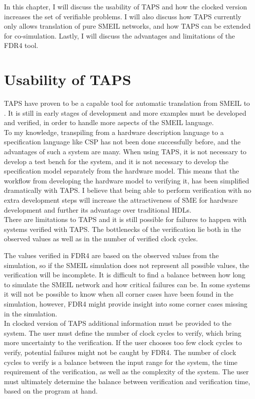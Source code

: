 In this chapter, I will discuss the usability of TAPS and how the clocked version increases the set of verifiable problems. I will also discuss how TAPS currently only allows translation of pure SMEIL networks, and how TAPS can be extended for co-simulation. Lastly, I will discuss the advantages and limitations of the FDR4 tool.
\section{Usability of TAPS}
TAPS have proven to be a capable tool for automatic translation from SMEIL to \cspm{}. It is still in early stages of development and more examples must be developed and verified, in order to handle more aspects of the SMEIL language.\\

To my knowledge, transpiling from a hardware description language to a specification language like CSP has not been done successfully before, and the advantages of such a system are many. When using TAPS, it is not necessary to develop a test bench for the system, and it is not necessary to develop the specification model separately from the hardware model. This means that the workflow from developing the hardware model to verifying it, has been simplified dramatically with TAPS. I believe that being able to perform verification with no extra development steps will increase the attractiveness of SME for hardware development and further its advantage over traditional HDLs.\\

There are limitations to TAPS and it is still possible for failures to happen with systems verified with TAPS. The bottlenecks of the verification lie both in the observed values as well as in the number of verified clock cycles.

The values verified in FDR4 are based on the observed values from the simulation, so if the SMEIL simulation does not represent all possible values, the verification will be incomplete.
It is difficult to find a balance between how long to simulate the SMEIL network and how critical failures can be. In some systems it will not be possible to know when all corner cases have been found in the simulation, however, FDR4 might provide insight into some corner cases missing in the simulation.\\

In clocked version of TAPS additional information must be provided to the system. The user must define the number of clock cycles to verify, which bring more uncertainty to the verification. If the user chooses too few clock cycles to verify, potential failures might not be caught by FDR4. The number of clock cycles to verify is a balance between the input range for the system, the time requirement of the verification, as well as the complexity of the system.
The user must ultimately determine the balance between verification and verification time, based on the program at hand. \\

